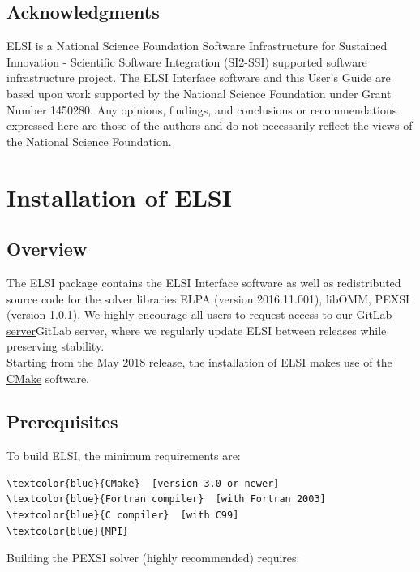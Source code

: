 \documentclass{report}
\begin{document}
\section{Acknowledgments}
\label{sec:thanks}
ELSI is a National Science Foundation Software Infrastructure for Sustained Innovation - Scientific Software Integration (SI2-SSI) supported software infrastructure project.  The ELSI Interface software and this User's Guide are based upon work supported by the National Science Foundation under Grant Number 1450280.  Any opinions, findings, and conclusions or recommendations expressed here are those of the authors and do not necessarily reflect the views of the National Science Foundation.\\

\chapter{Installation of ELSI}
\section{Overview}
\label{sec:install}
The ELSI package contains the ELSI Interface software as well as redistributed source code for the solver libraries ELPA (version 2016.11.001), libOMM, PEXSI (version 1.0.1).  We highly encourage all users to request access to our \href{http://git.elsi-interchange.org/elsi-devel}{GitLab server}GitLab server, where we regularly update ELSI between releases while preserving stability.\\

Starting from the May 2018 release, the installation of ELSI makes use of the \href{http://cmake.org}{CMake} software.\\

\section{Prerequisites}
\label{sec:prereq}
To build ELSI, the minimum requirements are:\\

\begin{Verbatim}[commandchars=\\\{\}]
\textcolor{blue}{CMake}  [version 3.0 or newer]
\textcolor{blue}{Fortran compiler}  [with Fortran 2003]
\textcolor{blue}{C compiler}  [with C99]
\textcolor{blue}{MPI}
\end{Verbatim}

Building the PEXSI solver (highly recommended) requires:\\
\end{document}
